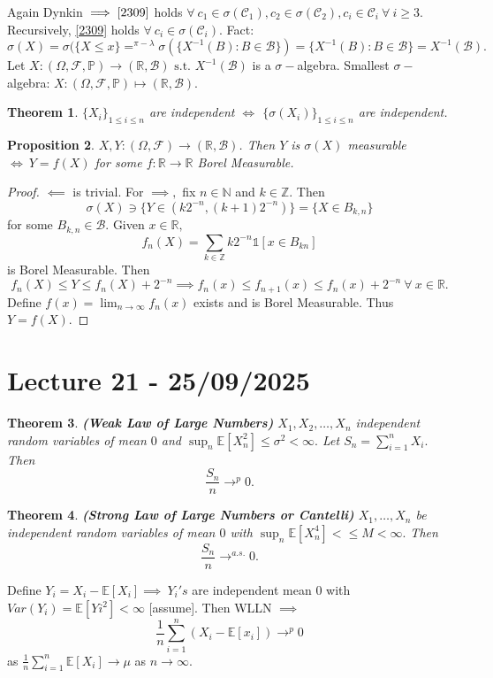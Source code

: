 \documentclass{article}
\newcommand{\1}{\mathds{1}}
\newcommand{\R}{\mathbb{R}}
\newcommand{\E}{\mathbb{E}}
\newcommand{\Z}{\mathbb{Z}}
\newcommand{\N}{\mathbb{N}}
\newcommand{\F}{\mathcal{F}}
\newcommand{\B}{\mathcal{B}}
\newcommand{\PB}{\mathbb{P}}
\newcommand{\f}[2]{\frac{#1}{#2}}
\newcommand{\C}{\mathcal{C}}
\newcommand{\st}{\text{ s.t. }}
\newtheorem{theorem}{Theorem}[section]
\newtheorem{proposition}[theorem]{Proposition}
\begin{document}
Again Dynkin $\implies \eqref{2309}$ holds $\forall\ c_1\in\sigma(\C_1),c_2\in\sigma(\C_2),c_i\in\C_i\ \forall\ i\geq 3.$ Recursively, \eqref{2309} holds $\forall\ c_i\in\sigma(\C_i).$
Fact: $$\sigma(X)=\sigma(\{X\leq x\}=^{\pi-\lambda}\sigma(\{X^{-1}(B):B\in\B\})=\{X^{-1}(B):B\in\B\}=X^{-1}(\B).$$ Let $X:(\Omega,\F,\PB)\to(\R,\B)\st X^{-1}(\B)$ is a $\sigma-$algebra.
Smallest $\sigma-$algebra: $X:(\Omega,\F,\PB)\mapsto (\R,\B).$
\begin{theorem}
    $\{X_i\}_{1\leq i\leq n}$ are independent $\iff$ $\{\sigma(X_i)\}_{1\leq i\leq n}$ are independent.
\end{theorem}
\begin{proposition}
    $X,Y:(\Omega,\F)\to(\R,\B)$. Then $Y$ is $\sigma(X)$ measurable $\iff\ Y=f(X)$ for some $f:\R\to\R$ Borel Measurable. 
\end{proposition}
\begin{proof}
    $\impliedby$ is trivial. For $\implies,$ fix $n\in\N$ and $k\in\Z.$ Then $$\sigma(X)\ni\{Y\in(k2^{-n},(k+1)2^{-n})\}=\{X\in B_{k,n}\}$$ for some $B_{k,n}\in\B.$ Given $x\in \R,$ $$f_n(X)=\sum_{k\in\Z}k2^{-n}\1[x\in B_{kn}]$$ is Borel Measurable.
    Then $$f_n(X)\leq Y\leq f_n(X)+2^{-n}\implies f_n(x)\leq f_{n+1}(x)\leq f_n(x)+2^{-n}\ \forall\ x\in\R.$$ Define $f(x)=\lim_{n\to\infty}f_n(x)$ exists and is Borel Measurable. Thus $Y=f(X).$
\end{proof}
\section{Lecture 21 - 25/09/2025}
\begin{theorem}\textbf{(Weak Law of Large Numbers)}
   $X_1,X_2,\ldots,X_n$ independent random variables of mean $0$ and $\sup_n\E[X_n^2]\leq \sigma^2<\infty.$ Let $S_n=\sum_{i=1}^n X_i.$ Then $$\f {S_n}n\to^p 0.$$   
\end{theorem}
\begin{theorem}\textbf{(Strong Law of Large Numbers or Cantelli)}
    $X_1,\ldots,X_n$ be independent random variables of mean $0$ with $\sup_n\E[X_n^4]<\leq M<\infty.$ Then $$\f {S_n}n\to^{a.s.} 0.$$ 
\end{theorem}
Define $Y_i=X_i-\E[X_i]\implies\ Y_i's$ are independent mean $0$ with $Var(Y_i)=\E[Yi^2]<\infty$ [assume]. Then WLLN $\implies$
$$\f 1n\sum_{i=1}^n (X_i-\E[x_i])\to^p 0$$ as $\f 1n\sum_{i=1}^n\E[X_i]\to\mu$ as $n\to\infty.$ 
\end{document}
